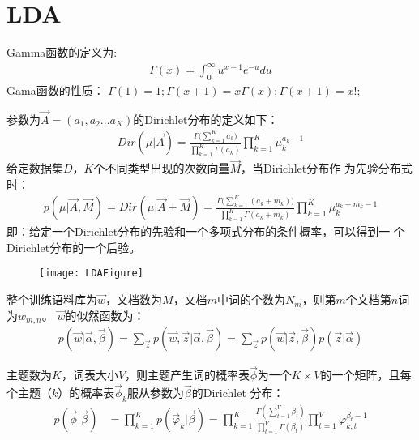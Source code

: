 \section{LDA}
\maketitle
Gamma函数的定义为:
\begin{displaymath}
\begin{split}
\Gamma(x)=\int_{0}^{\infty}{u^{x-1}e^{-u}du}
\end{split}
\end{displaymath}
Gama函数的性质：
$\Gamma(1)=1; \Gamma(x+1)=x\Gamma(x); \Gamma(x+1) = x!;$

参数为$\vec{A} = (a_1,a_2...a_K)$的Dirichlet分布的定义如下：
\begin{displaymath}
\begin{split}
Dir(\mu|\vec{A})=\frac{\Gamma{(\sum_{k=1}^{K}{a_k}})}{\prod_{k=1}^{K}{\Gamma{(a_k)}}}\prod_{k=1}^{K}{\mu_{k}^{a_k-1}}
\end{split}
\end{displaymath}
给定数据集$D$，$K$个不同类型出现的次数向量$\vec{M}$，当Dirichlet分布作
为先验分布式时：
\begin{displaymath}
\begin{split}
p(\mu|\vec{A},\vec{M})= Dir(\mu|\vec{A}+\vec{M}) = \frac{\Gamma{(\sum_{k=1}^{K}{(a_k+m_k)}})}{\prod_{k=1}^{K}{\Gamma{(a_k+m_k)}}}\prod_{k=1}^{K}{\mu_{k}^{a_k+m_k-1}}
\end{split}
\end{displaymath}
即：给定一个Dirichlet分布的先验和一个多项式分布的条件概率，可以得到一
个Dirichlet分布的一个后验。

\begin{figure}[htbp]
\centering
\texttt{[image: LDAFigure]}
\end{figure}

整个训练语料库为$\vec{w}$，文档数为$M$，文档$m$中词的个数为$N_m$，则第$m$个文档第$n$词为$w_{m,n}$。
$\vec{w}$的似然函数为：
\begin{displaymath}
\begin{split}
p(\vec{w}|\vec{\alpha}, \vec{\beta}) =
\sum_{\vec{z}}{p(\vec{w}, \vec{z}|\vec{\alpha}, \vec{\beta})}
=\sum_{\vec{z}}{p(\vec{w}|\vec{z},\vec{\beta}) p(\vec{z}|\vec{\alpha})}
\end{split}
\end{displaymath} 

主题数为$K$，词表大小$V$，则主题产生词的概率表$\vec{\phi}$为一个$K
\times V$的一个矩阵，且每个主题（$k$）的概率表$\vec{\phi}_k$服从参数为$\vec{\beta}$的Dirichlet
分布：
\begin{displaymath}
\begin{split}
p(\vec{\phi}|\vec{\beta}) &= \prod_{k=1}^{K}{p(\vec{\varphi}_k|\vec{\beta})} 
=\prod_{k=1}^{K}{\frac{\Gamma(\sum_{t=1}^{V}{\beta_t})}{\prod_{t=1}^{V}{\Gamma(\beta_t)}}\prod_{t=1}^{V}{\varphi_{k,t}^{\beta_t-1}}} \\
\end{split}
\end{displaymath} 


